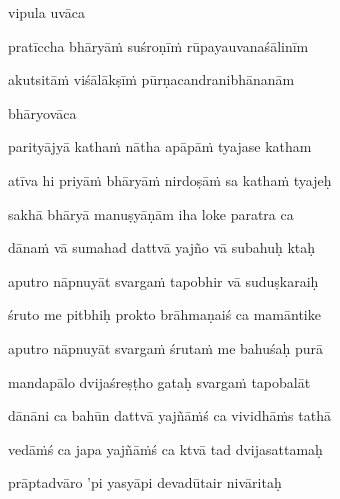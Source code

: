 vipula uvāca~{\dandab}\dontdisplaylinenum 
{}

pratīccha bhāryāṁ suśroṇīṁ rūpayauvanaśālinīm\thinspace{\danda} \dontdisplaylinenum

akutsitāṁ viśālākṣīṁ pūrṇacandranibhānanām \veg\dontdisplaylinenum

bhāryovāca~{\dandab}\dontdisplaylinenum 

parityājyā kathaṁ nātha apāpāṁ tyajase katham\thinspace{\danda} \dontdisplaylinenum

atīva hi priyāṁ bhāryāṁ nirdoṣāṁ sa kathaṁ tyajeḥ \veg\dontdisplaylinenum
{}

sakhā bhāryā manuṣyāṇām iha loke paratra ca\thinspace{\dandab} \dontdisplaylinenum

dānaṁ vā sumahad dattvā yajño vā subahuḥ ktaḥ \veg\dontdisplaylinenum
{}

aputro nāpnuyāt svargaṁ tapobhir vā suduṣkaraiḥ\thinspace{\dandab} \dontdisplaylinenum

śruto me pitbhiḥ prokto brāhmaṇaiś ca mamāntike \veg\dontdisplaylinenum
{}

aputro nāpnuyāt svargaṁ śrutaṁ me bahuśaḥ purā\thinspace{\dandab} \dontdisplaylinenum

mandapālo dvijaśreṣṭho gataḥ svargaṁ tapobalāt \veg\dontdisplaylinenum

dānāni ca bahūn dattvā yajñāṁś ca vividhāṁs tathā\thinspace{\dandab} \dontdisplaylinenum

vedāṁś ca japa yajñāṁś ca ktvā tad dvijasattamaḥ \veg\dontdisplaylinenum
{}

prāptadvāro 'pi yasyāpi devadūtair nivāritaḥ\thinspace{\dandab} \dontdisplaylinenum

